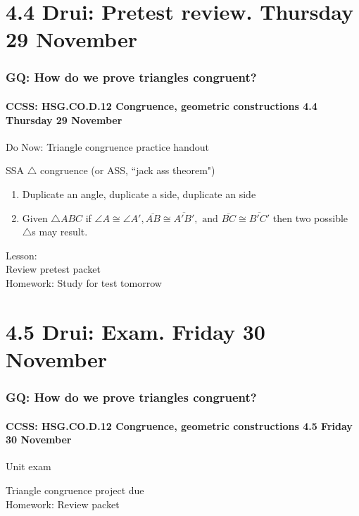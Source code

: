\documentclass{beamer}
\begin{document}
  \section{4.4 Drui: Pretest review. Thursday 29 November}
    \frame
    {
      \frametitle{GQ: How do we prove triangles congruent?}
      \framesubtitle{CCSS: HSG.CO.D.12 Congruence, geometric constructions  \alert{4.4 Thursday 29 November}}

      Do Now: Triangle congruence practice handout

      \begin{block}{SSA $\triangle$ congruence (or ASS, ``jack ass theorem")}
      \begin{enumerate}
          \item Duplicate an angle, duplicate a side, duplicate an side
          \item Given $\triangle ABC$ if $ \angle A \cong \angle A', \overline{AB} \cong \overline{A'B'}, \text{ and } \overline{BC} \cong \overline{B'C'}$ then two possible $\triangle$s may result.
      \end{enumerate}
      \end{block}
      Lesson: \\
      Review pretest packet\\[0.5cm]
      Homework: Study for \alert{test tomorrow}
    }

  \section{4.5 Drui: Exam. Friday 30 November}
    \frame
    {
      \frametitle{GQ: How do we prove triangles congruent?}
      \framesubtitle{CCSS: HSG.CO.D.12 Congruence, geometric constructions  \alert{4.5 Friday 30 November}}

      \begin{block}{Unit exam}
      \end{block}
      Triangle congruence project due\\[0.5cm]
      Homework: Review packet
    }
\end{document}
